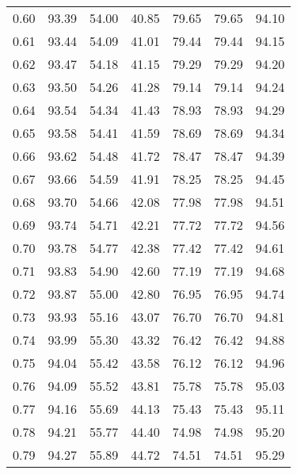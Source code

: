 \begin{tabular}{|c|c|c|c|c|c|c|}
      0.60 &     93.39 &     54.00 &      40.85 &   79.65 &      79.65 &         94.10 \\
      0.61 &     93.44 &     54.09 &      41.01 &   79.44 &      79.44 &         94.15 \\
      0.62 &     93.47 &     54.18 &      41.15 &   79.29 &      79.29 &         94.20 \\
      0.63 &     93.50 &     54.26 &      41.28 &   79.14 &      79.14 &         94.24 \\
      0.64 &     93.54 &     54.34 &      41.43 &   78.93 &      78.93 &         94.29 \\
      0.65 &     93.58 &     54.41 &      41.59 &   78.69 &      78.69 &         94.34 \\
      0.66 &     93.62 &     54.48 &      41.72 &   78.47 &      78.47 &         94.39 \\
      0.67 &     93.66 &     54.59 &      41.91 &   78.25 &      78.25 &         94.45 \\
      0.68 &     93.70 &     54.66 &      42.08 &   77.98 &      77.98 &         94.51 \\
      0.69 &     93.74 &     54.71 &      42.21 &   77.72 &      77.72 &         94.56 \\
      0.70 &     93.78 &     54.77 &      42.38 &   77.42 &      77.42 &         94.61 \\
      0.71 &     93.83 &     54.90 &      42.60 &   77.19 &      77.19 &         94.68 \\
      0.72 &     93.87 &     55.00 &      42.80 &   76.95 &      76.95 &         94.74 \\
      0.73 &     93.93 &     55.16 &      43.07 &   76.70 &      76.70 &         94.81 \\
      0.74 &     93.99 &     55.30 &      43.32 &   76.42 &      76.42 &         94.88 \\
      0.75 &     94.04 &     55.42 &      43.58 &   76.12 &      76.12 &         94.96 \\
      0.76 &     94.09 &     55.52 &      43.81 &   75.78 &      75.78 &         95.03 \\
      0.77 &     94.16 &     55.69 &      44.13 &   75.43 &      75.43 &         95.11 \\
      0.78 &     94.21 &     55.77 &      44.40 &   74.98 &      74.98 &         95.20 \\
      0.79 &     94.27 &     55.89 &      44.72 &   74.51 &      74.51 &         95.29 \\

\end{tabular}

